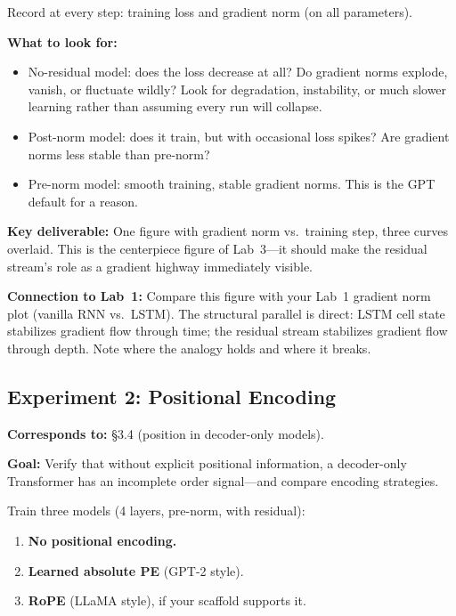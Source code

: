 \noindent Record at every step: training loss and gradient norm (on all parameters).

\textbf{What to look for:}
\begin{itemize}[nosep]
    \item No-residual model: does the loss decrease at all? Do gradient norms explode, vanish, or fluctuate wildly? Look for degradation, instability, or much slower learning rather than assuming every run will collapse.
    \item Post-norm model: does it train, but with occasional loss spikes? Are gradient norms less stable than pre-norm?
    \item Pre-norm model: smooth training, stable gradient norms. This is the GPT default for a reason.
\end{itemize}

\textbf{Key deliverable:} One figure with gradient norm vs.\ training step, three curves overlaid. This is the centerpiece figure of Lab~3---it should make the residual stream's role as a gradient highway immediately visible.

\textbf{Connection to Lab~1:} Compare this figure with your Lab~1 gradient norm plot (vanilla RNN vs.\ LSTM). The structural parallel is direct: LSTM cell state stabilizes gradient flow through time; the residual stream stabilizes gradient flow through depth. Note where the analogy holds and where it breaks.

\subsection*{Experiment 2: Positional Encoding}

\textbf{Corresponds to:} \S3.4 (position in decoder-only models).

\textbf{Goal:} Verify that without explicit positional information, a decoder-only Transformer has an incomplete order signal---and compare encoding strategies.

Train three models (4 layers, pre-norm, with residual):

\begin{enumerate}[nosep]
    \item \textbf{No positional encoding.}
    \item \textbf{Learned absolute PE} (GPT-2 style).
    \item \textbf{RoPE} (LLaMA style), if your scaffold supports it.
\end{enumerate}

